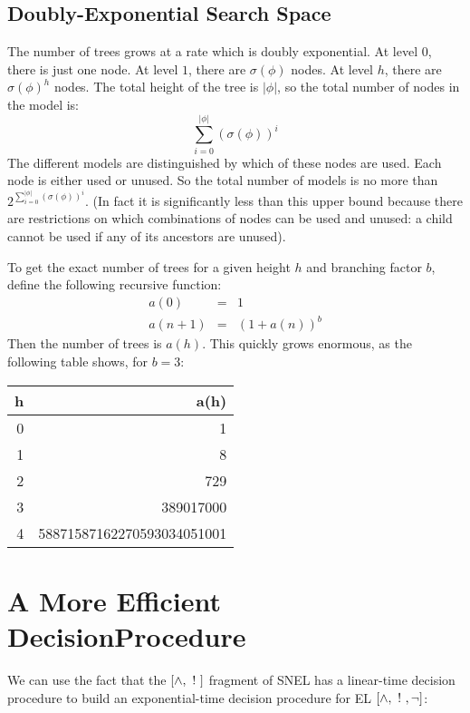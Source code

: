 \subsection{Doubly-Exponential Search Space}
The number of trees grows at a rate which is doubly exponential.
At level $0$, there is just one node.
At level $1$, there are $\sigma(\phi)$ nodes.
At level $h$, there are $\sigma(\phi)^h$ nodes.
The total height of the tree is $|\phi|$, so the total number of nodes in the model is:
\[
\sum_{i=0}^{|\phi|} (\sigma(\phi))^i
\]
The different models are distinguished by which of these nodes are used. 
Each node is either used or unused.
So the total number of models is no more than $2 ^ {\sum_{i=0}^{|\phi|} (\sigma(\phi))^i}$.
(In fact it is significantly less than this upper bound because there are restrictions on which combinations of nodes can be used and unused: a child cannot be used if any of its ancestors are unused).

To get the exact number of trees for a given height $h$ and branching factor $b$, define the following recursive function:
\begin{eqnarray*}
a(0) & = & 1 \\
a(n+1) & = & (1+a(n))^b 
\end{eqnarray*}
Then the number of trees is $a(h)$.
This quickly grows enormous, as the following table shows, for $b = 3$:
\begin{center}
\begin{tabular}{ r | r }
h & a(h) \\
\hline
0 & 1 \\
1 & 8 \\
2 & 729 \\
3 & 389017000 \\
4 & 58871587162270593034051001
\end{tabular}
\end{center}
    
\section{A More Efficient DecisionProcedure}
We can use the fact that the $[\land, \ ! \ ]$ fragment of SNEL has a linear-time decision procedure to build an exponential-time decision procedure for EL $[\land, \ ! \ , \neg]$:

